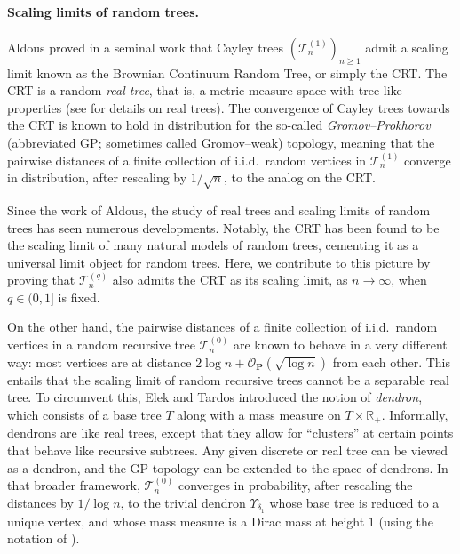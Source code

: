 \documentclass{article}
\theoremstyle{remark}
\newcommand{\cO}{\mathcal{O}}
\newcommand{\cT}{\mathcal{T}}
\newcommand{\bP}{\mathbf{P}}
\begin{document}
\paragraph{Scaling limits of random trees.}
Aldous proved in a seminal work \cite{Aldous_1993} that Cayley trees $(\cT_n^{(1)})_{n \geq 1}$
admit a scaling limit known as the Brownian Continuum Random Tree, or simply the CRT.
The CRT is a random \emph{real tree}, that is, a metric measure space with tree-like properties (see  for details on real trees).
The convergence of Cayley trees towards the CRT is known to hold in distribution for the so-called 
\emph{Gromov--Prokhorov} (abbreviated GP; sometimes called Gromov--weak) topology,  
meaning that the pairwise distances of a finite collection of i.i.d.~random vertices in $\cT_n^{(1)}$ converge in distribution, after rescaling by $1/\sqrt n$, to the analog on the CRT.

Since the work of Aldous, the study of real trees and scaling limits of random trees has seen numerous developments.
Notably, the CRT has been found to be the scaling limit of many natural models of random trees, cementing it as a universal limit object for random trees.
Here, we contribute to this picture by proving that $\cT_n^{(q)}$ also admits the CRT as its scaling limit, as $n\to\infty$, when $q\in(0,1]$ is fixed.

On the other hand, the pairwise distances of a finite collection of i.i.d.~random vertices in a random recursive tree $\cT_n^{(0)}$ are known to 
behave in a very different way: 
most vertices are at distance $2\log n + \cO_\bP(\sqrt{\log n})$ from each other.
This entails that the scaling limit of random recursive trees cannot be a separable real tree.
To circumvent this, Elek and Tardos \cite{ET22} introduced the notion of \emph{dendron}, which consists of a base tree $T$ along with a mass measure on $T \times \mathbb{R}_+$. Informally, dendrons are like real trees, except that they allow for \enquote{clusters} at certain points that behave like recursive subtrees.
Any given discrete or real tree can be viewed as a dendron, and the GP topology can be extended to the space of dendrons.
In that broader framework, $\cT_n^{(0)}$ converges in probability, after rescaling the distances by $1/\log n$, to the trivial dendron $\Upsilon_{\delta_1}$ whose base tree is reduced to a unique vertex, and whose mass measure is a Dirac mass at height $1$ (using the notation of \cite{Janson21}).
\end{document}
